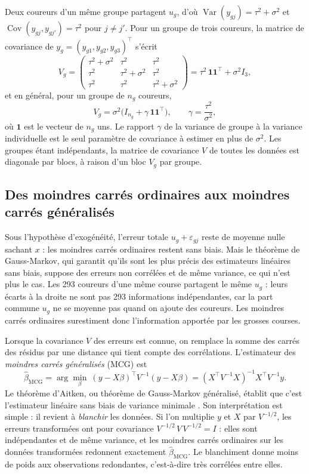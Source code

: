 \documentclass[11pt,a4paper]{article}
\DeclareMathOperator{\Var}{Var}
\DeclareMathOperator{\Cov}{Cov}
\begin{document}
Deux coureurs d'un même groupe partagent $u_g$, d'où $\Var(y_{gj}) = \tau^2 + \sigma^2$ et
$\Cov(y_{gj}, y_{gj'}) = \tau^2$ pour $j \neq j'$. Pour un groupe de trois coureurs, la matrice de covariance de
$y_g = (y_{g1}, y_{g2}, y_{g3})^\top$ s'écrit
\[
V_g = \begin{pmatrix} \tau^2+\sigma^2 & \tau^2 & \tau^2 \\ \tau^2 & \tau^2+\sigma^2 & \tau^2 \\
\tau^2 & \tau^2 & \tau^2+\sigma^2 \end{pmatrix} = \tau^2\,\mathbf 1\mathbf 1^\top + \sigma^2 I_3 ,
\]
et en général, pour un groupe de $n_g$ coureurs,
\begin{equation}\label{eq:Vg}
V_g = \sigma^2\big(I_{n_g} + \gamma\,\mathbf 1\mathbf 1^\top\big), \qquad \gamma = \frac{\tau^2}{\sigma^2},
\end{equation}
où $\mathbf 1$ est le vecteur de $n_g$ uns. Le rapport $\gamma$ de la variance de groupe à la variance individuelle
est le seul paramètre de covariance à estimer en plus de $\sigma^2$. Les groupes étant indépendants, la matrice de
covariance $V$ de toutes les données est diagonale par blocs, à raison d'un bloc $V_g$ par groupe.

\subsection{Des moindres carrés ordinaires aux moindres carrés généralisés}\label{sec:mcg}

Sous l'hypothèse d'exogénéité, l'erreur totale $u_g + \varepsilon_{gj}$ reste de moyenne nulle sachant $x$ : les
moindres carrés ordinaires restent sans biais. Mais le théorème de Gauss-Markov, qui garantit qu'ils sont les plus
précis des estimateurs linéaires sans biais, suppose des erreurs non corrélées et de même variance, ce qui n'est plus
le cas. Les 293 coureurs d'une même course partagent le même $u_g$ : leurs écarts à la droite ne sont pas 293
informations indépendantes, car la part commune $u_g$ ne se moyenne pas quand on ajoute des coureurs. Les moindres
carrés ordinaires surestiment donc l'information apportée par les grosses courses.

Lorsque la covariance $V$ des erreurs est connue, on remplace la somme des carrés des résidus par une distance qui
tient compte des corrélations. L'estimateur des \emph{moindres carrés généralisés} (MCG) est
\[
\hat\beta_{\text{MCG}} = \arg\min_\beta\ (y - X\beta)^\top V^{-1} (y - X\beta) = (X^\top V^{-1}X)^{-1}X^\top V^{-1}y .
\]
Le théorème d'Aitken, ou théorème de Gauss-Markov généralisé, établit que c'est l'estimateur linéaire sans biais de
variance minimale \citep{aitken1935}. Son interprétation est simple : il revient à \emph{blanchir} les données. Si
l'on multiplie $y$ et $X$ par $V^{-1/2}$, les erreurs transformées ont pour covariance $V^{-1/2}\,V\,V^{-1/2} = I$ :
elles sont indépendantes et de même variance, et les moindres carrés ordinaires sur les données transformées
redonnent exactement $\hat\beta_{\text{MCG}}$. Le blanchiment donne moins de poids aux observations redondantes,
c'est-à-dire très corrélées entre elles.
\end{document}
